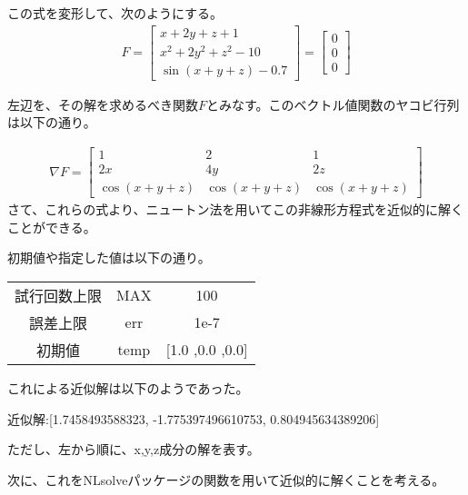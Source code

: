 \documentclass{ltjsarticle}
\begin{document}
この式を変形して、次のようにする。
\begin{align}
    F = 
    \begin{bmatrix}
        x+2y+z+1\\
        x^{2} + 2y^{2} + z^{2} -10\\
        \sin(x+y+z)-0.7
    \end{bmatrix}
    =
    \begin{bmatrix}
        0\\
        0\\
        0
    \end{bmatrix}
\end{align}

左辺を、その解を求めるべき関数$F$とみなす。このベクトル値関数のヤコビ行列は以下の通り。

\begin{align}
    \nabla F = 
    \begin{bmatrix}
        1 & 2 & 1 \\
        2x & 4y & 2z \\
        \cos(x+y+z) & \cos(x+y+z) & \cos(x+y+z)
    \end{bmatrix}
\end{align}
さて、これらの式より、ニュートン法を用いてこの非線形方程式を近似的に解くことができる。

初期値や指定した値は以下の通り。
\begin{table}[H]
    \centering
    \begin{tabular}{c|cc}
        \hline \hline
        試行回数上限 & MAX & 100\\
        誤差上限 & err & 1e-7\\
        初期値 & temp & [1.0 ,0.0 ,0.0]\\
        \hline \hline
    \end{tabular}
\end{table}

これによる近似解は以下のようであった。
\begin{center}
    近似解:[1.7458493588323, -1.775397496610753, 0.804945634389206]
\end{center}
ただし、左から順に、x,y,z成分の解を表す。

次に、これをNLsolveパッケージの関数を用いて近似的に解くことを考える。
\end{document}
